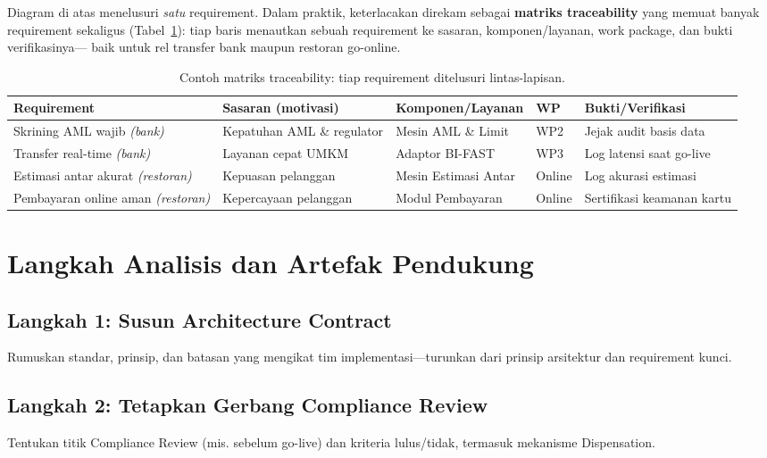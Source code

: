 Diagram di atas menelusuri \emph{satu} requirement. Dalam praktik, keterlacakan
direkam sebagai \textbf{matriks traceability} yang memuat banyak requirement
sekaligus (Tabel~\ref{tab:traceability-matrix}): tiap baris menautkan sebuah
requirement ke sasaran, komponen/layanan, work package, dan bukti verifikasinya---
baik untuk rel transfer bank maupun restoran go-online.

\begin{table}[htbp]
\centering
\scriptsize
\caption{Contoh matriks traceability: tiap requirement ditelusuri lintas-lapisan.}
\label{tab:traceability-matrix}
\begin{tabularx}{\textwidth}{@{}p{} p{} p{} p{} X@{}}
\hline
\textbf{Requirement} & \textbf{Sasaran (motivasi)} & \textbf{Komponen/Layanan} &
\textbf{WP} & \textbf{Bukti/Verifikasi} \\
\hline
Skrining AML wajib \emph{(bank)} & Kepatuhan AML \& regulator & Mesin AML \& Limit &
WP2 & Jejak audit basis data \\
Transfer real-time \emph{(bank)} & Layanan cepat UMKM & Adaptor BI-FAST & WP3 & Log
latensi saat go-live \\
Estimasi antar akurat \emph{(restoran)} & Kepuasan pelanggan & Mesin Estimasi Antar &
Online & Log akurasi estimasi \\
Pembayaran online aman \emph{(restoran)} & Kepercayaan pelanggan & Modul Pembayaran &
Online & Sertifikasi keamanan kartu \\
\hline
\end{tabularx}
\end{table}

\section{Langkah Analisis dan Artefak Pendukung}

\subsection{Langkah 1: Susun Architecture Contract}
Rumuskan standar, prinsip, dan batasan yang mengikat tim implementasi---turunkan
dari prinsip arsitektur dan requirement kunci.

\subsection{Langkah 2: Tetapkan Gerbang Compliance Review}
Tentukan titik Compliance Review (mis. sebelum go-live) dan kriteria lulus/tidak,
termasuk mekanisme Dispensation.

